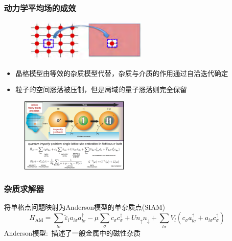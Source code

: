 {\frame
{
	\frametitle{动力学平均场的成效}
\begin{figure}[h!]
\centering
\vspace{-8pt}
\includegraphics[height=0.8in,width=2.65in,viewport=0 0 1450 470,clip]{Figures/The-Dmft-site_atom-embedded.png}
\label{Dmft_site_atom-embeddded}
\end{figure}
\begin{itemize}
	\item 晶格模型由等效的杂质模型代替，杂质与介质的作用通过自洽迭代确定
	\item 粒子的空间涨落被压制，但是局域的量子涨落则完全保留
\end{itemize}
\begin{figure}[h!]
\centering
\vspace{-9pt}
\includegraphics[height=1.45in,width=2.15in,viewport=0 0 1420 985,clip]{Figures/Quantum_impurity_problem.png}
\label{Qunatum_impurity_primble}
\end{figure}
}

\frame
{
	\frametitle{杂质求解器}
	将单格点问题映射为\textrm{Anderson}模型的单杂质点\textrm{(SIAM)}
	\begin{displaymath}
			H_{\mathrm{AM}}=\sum_{l\sigma}\tilde{\varepsilon}_la_{l\sigma}a_{l\sigma}^{\dag}-\mu\sum_{\sigma}c_{\sigma}c_{\sigma}^{\dag}+Un_{\uparrow}n_{\downarrow}+\sum_{l\sigma}V_l(c_{\sigma}a_{l\sigma}^{\dag}+a_{l\sigma}c_{\sigma}^{\dag})
	\end{displaymath}
	\textrm{Anderson}模型:~描述了一般金属中的磁性杂质

}}
